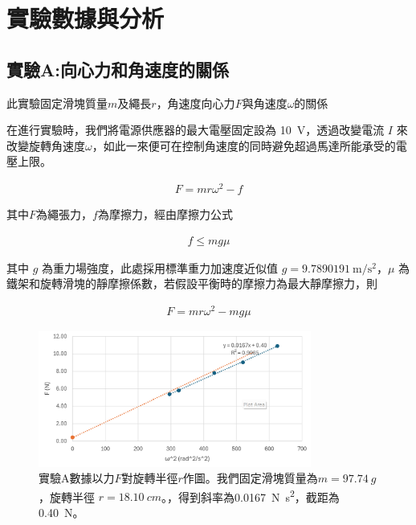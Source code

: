 \documentclass[11pt,a4paper]{article}
\theoremstyle{definition}
\begin{document}
    \section{實驗數據與分析}

        \subsection{實驗A:向心力和角速度的關係}

        此實驗固定滑塊質量$m$及繩長$r$，角速度向心力$F$與角速度$\omega$的關係
        \par
        在進行實驗時，我們將電源供應器的最大電壓固定設為
        \SI{10}{\volt}，透過改變電流 $I$ 來改變旋轉角速度$\omega$，如此一來便可在控制角速度的同時避免超過馬達所能承受的電壓上限。

        \begin{gather}
            F = mr\omega^2 - f
        \end{gather}

        其中$F$為繩張力，$f$為摩擦力，經由摩擦力公式

        \begin{gather}
            f \leq m g \mu
        \end{gather}

        其中 $g$ 為重力場強度，此處採用標準重力加速度近似值 $g = \SI{9.7890191}{\meter\per\second\squared}$\cite{TWD2000}，$\mu$ 為鐵架和旋轉滑塊的靜摩擦係數，若假設平衡時的摩擦力為最大靜摩擦力，則

        \begin{gather}
            F = mr\omega^2 - m g \mu
        \end{gather}

        \begin{figure}[H]
            \centering
            \includegraphics[width=0.8\textwidth]{實驗A數據.png}
            \caption{實驗A數據以力$F$對旋轉半徑$r$作圖。我們固定滑塊質量為$m = 97.74\ g$，旋轉半徑 $r = 18.10\ cm$。，得到斜率為\SI{0.0167}{\newton\second\squared}，截距為\SI{0.40}{\newton}。}
            \label{fig:實驗A數據 Excel原始數據}
        \end{figure}
    
\end{document}
